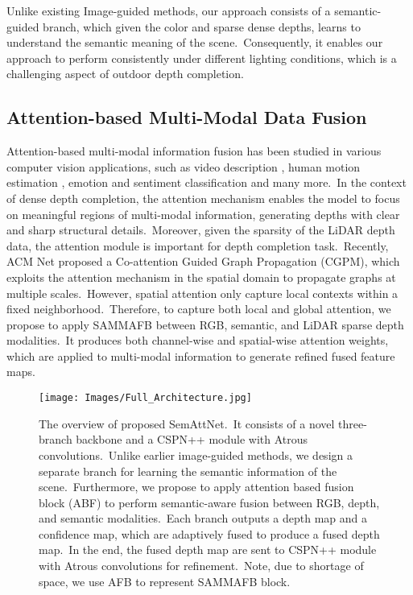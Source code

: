 \documentclass{ieeeaccess}
\begin{document}
Unlike existing Image-guided methods, our approach consists of a semantic-guided branch, which given the color and sparse dense depths, learns to understand the semantic meaning of the scene.~Consequently, it enables our approach to perform consistently under different lighting conditions, which is a challenging aspect of outdoor depth completion.

 


\subsection{Attention-based Multi-Modal Data Fusion}

Attention-based multi-modal information fusion has been studied in various computer vision applications, such as video description \cite{hori2017attention}, human motion estimation \cite{li2020attention}, emotion and sentiment classification \cite{huddar2021attention} and 
many more.~In the context of dense depth completion, the attention mechanism enables the model to focus on meaningful regions of multi-modal information, generating depths with clear and sharp structural details.~Moreover, given the sparsity of the LiDAR depth data, the attention module is important for depth completion task.~Recently, ACM Net \cite{zhao2021adaptive} proposed a Co-attention Guided Graph Propagation (CGPM), which exploits the attention mechanism in the spatial domain to propagate graphs at multiple scales.~However, spatial attention only capture local contexts within a fixed neighborhood.~Therefore, to capture both local and global attention, we propose to apply SAMMAFB between RGB, semantic, and LiDAR sparse depth modalities.~It produces both channel-wise and spatial-wise attention weights, which are applied to multi-modal information to generate refined fused feature maps.
\begin{figure*}
\begin{center}
    \texttt{[image: Images/Full\_Architecture.jpg]} 
\end{center}
\caption{The overview of proposed SemAttNet.~It consists of a novel three-branch backbone and a CSPN++ module with Atrous convolutions.~Unlike earlier image-guided methods, we design a separate branch for learning the semantic information of the scene.~Furthermore, we propose to apply attention based fusion block (ABF) to perform semantic-aware fusion between RGB, depth, and semantic modalities.~Each branch outputs a depth map and a confidence map, which are adaptively fused to produce a fused depth map.~In the end, the fused depth map are sent to CSPN++ module with Atrous convolutions for refinement.~Note, due to shortage of space, we use AFB to represent SAMMAFB block. }


\label{SemAttNet_Architecture}
\end{figure*}
\end{document}

